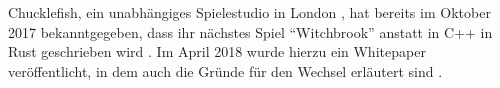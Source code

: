 Chucklefish, ein unabhängiges Spielestudio in London \cite{chucklefish:about}, hat bereits im Oktober 2017 bekanntgegeben, dass ihr nächstes Spiel \enquote{Witchbrook} anstatt in C++ in Rust geschrieben wird \cite{chucklefish:rust:reddit}.
Im April 2018 wurde hierzu ein Whitepaper veröffentlicht, in dem auch die Gründe für den Wechsel erläutert sind \cite{chucklefish:rust:whitepaper}.

 







